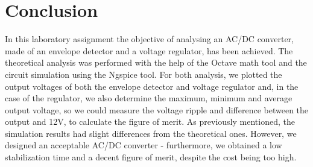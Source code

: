 \section{Conclusion}
\label{sec:conclusion}

In this laboratory assignment the objective of analysing an AC/DC converter, made of an envelope detector and a voltage regulator, has been achieved. The theoretical analysis was performed with the help of the Octave math tool and the circuit simulation using the Ngspice tool. For both analysis, we plotted the output voltages of both the envelope detector and voltage regulator and, in the case of the regulator, we also determine the maximum, minimum and average output voltage, so we could measure the voltage ripple and difference between the output and 12V, to calculate the figure of merit. As previously mentioned, the simulation results had slight differences from the theoretical ones. However, we designed an acceptable AC/DC converter - furthermore, we obtained a low stabilization time and a decent figure of merit, despite the cost being too high.
